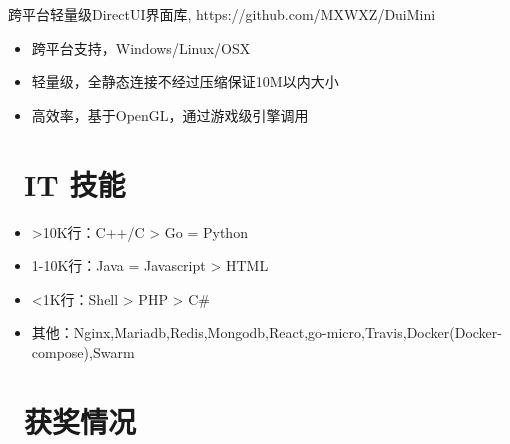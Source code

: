 \documentclass{resume}
\begin{document}
\begin{onehalfspacing}
    跨平台轻量级DirectUI界面库, https://github.com/MXWXZ/DuiMini
    \begin{itemize}
        \item 跨平台支持，Windows/Linux/OSX
        \item 轻量级，全静态连接不经过压缩保证10M以内大小
        \item 高效率，基于OpenGL，通过游戏级引擎调用
    \end{itemize}
\end{onehalfspacing}


\section{\faCogs\ IT 技能}
\begin{itemize}[parsep=0.5ex]
    \item >10K行：C++/C > Go = Python
    \item 1-10K行：Java = Javascript > HTML
    \item <1K行：Shell > PHP > C\#
    \item 其他：Nginx,Mariadb,Redis,Mongodb,React,go-micro,Travis,Docker(Docker-compose),Swarm
\end{itemize}

\section{\faHeartO\ 获奖情况}
\end{document}
